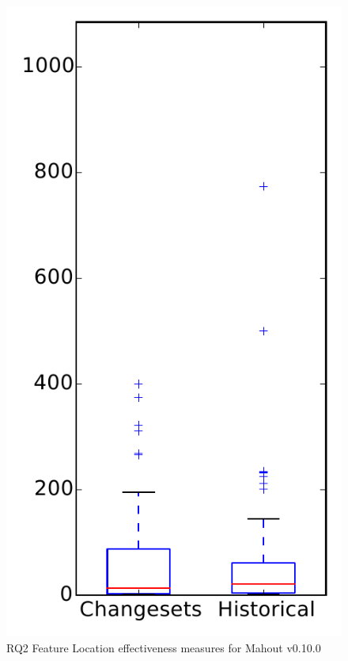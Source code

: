
\begin{figure}
\centering
\includegraphics[height=0.4\textheight]{figures/flt/rq2_mahout}
\caption{RQ2 Feature Location effectiveness measures for Mahout v0.10.0}
\label{fig:flt:rq2:mahout}
\end{figure}
